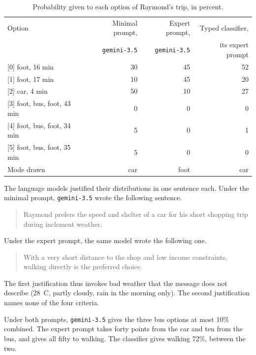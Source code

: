 \begin{table}[ht]
  \caption{Probability given to each option of Raymond's trip, in percent.}
  \label{tab:app-trip}
  \begin{tabular}{lrrr}
    \toprule
    Option & Minimal prompt, & Expert prompt, & Typed classifier, \\
           & \texttt{gemini-3.5} & \texttt{gemini-3.5} & its expert prompt \\
    \midrule
    {[0]} foot, 16 min            & 30 & 45 & 52 \\
    {[1]} foot, 17 min            & 10 & 45 & 20 \\
    {[2]} car, 4 min              & 50 & 10 & 27 \\
    {[3]} foot, bus, foot, 43 min &  0 &  0 &  0 \\
    {[4]} foot, bus, foot, 34 min &  5 &  0 &  1 \\
    {[5]} foot, bus, foot, 35 min &  5 &  0 &  0 \\
    \addlinespace
    Mode drawn                    & car & foot & car \\
    \bottomrule
  \end{tabular}
\end{table}

The language models justified their distributions in one sentence each. Under the minimal
prompt, \texttt{gemini-3.5} wrote the following sentence.

\begin{quote}
Raymond prefers the speed and shelter of a car for his short shopping trip during inclement weather.
\end{quote}

Under the expert prompt, the same model wrote the following one.

\begin{quote}
With a very short distance to the shop and low income constraints, walking directly is the preferred choice.
\end{quote}

The first justification thus invokes bad weather that the message does not describe
(28~\textdegree{}C, partly cloudy, rain in the morning only). The second justification names
none of the four criteria.

Under both prompts, \texttt{gemini-3.5} gives the three bus options at most 10\% combined.
The expert prompt takes forty points from the car and ten from the bus, and gives
all fifty to walking. The classifier gives walking 72\%, between the two.

